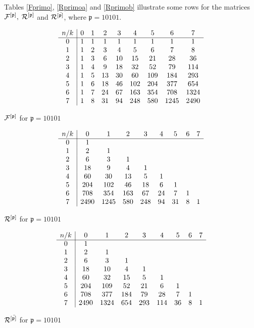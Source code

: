 \begin{example}
Tables \ref{Fprimo}, \ref{Rprimoa} and \ref{Rprimob}
illustrate some rows for the matrices ${\cal{F}^{[\mathfrak{p}]}},$
${\cal{R}^{[\mathfrak{p}]}}$ and ${\cal{R}^{[\bar{\mathfrak{p}]}}}$, where
$\mathfrak{p}=10101$.
\begin{table}
$$
\begin{array}{c|cccccccc}
n/k  & 0 & 1 & 2 & 3 & 4 &5 &6 &7  \\ \cline{1-9}
0 & 1 & 1 & 1 & 1& 1 &  1 & 1 & 1\\
1 & 1 & 2 & 3 & 4 & 5 & 6 & 7 & 8 \\
2 & 1 & 3 & 6 & 10 & 15 & 21 & 28 & 36\\
3 & 1 & 4 & 9 & 18 & 32 & 52& 79 & 114\\
4 & 1& 5 & 13 & 30 & 60 & 109& 184 & 293\\
5 & 1 & 6 & 18 & 46 & 102 & 204 & 377 & 654\\
6 & 1 & 7 & 24 & 67 & 163 & 354& 708 & 1324\\
7 & 1 & 8 & 31 & 94 & 248 &580& 1245 &2490\\
\end{array}
$$
\caption{\label{Fprimo} ${\cal{F}^{[\mathfrak{p}]}}$ for $\mathfrak{p}=10101$}
\end{table}
\begin{table}
$$
\begin{array}{c|cccccccc}
n/k  & 0 & 1 & 2 & 3 & 4 &5 &6 &7  \\ \cline{1-9}
0 & 1 & & & & & & &\\
1 & 2 & 1 & & &  & & &\\
2 & 6& 3 & 1 & & & &  &\\
3 & 18 & 9 & 4 & 1 & & &  &\\
4 & 60 & 30 & 13 & 5 & 1& & & \\
5 & 204 & 102 & 46 & 18 & 6 &1 & &\\
6 & 708 & 354 & 163 & 67 & 24 & 7& 1 &\\
7 & 2490 & 1245 &  580 &248 & 94 & 31 &  8 &1\\
\end{array}
$$
\caption{\label{Rprimoa} ${\cal{R}^{[\mathfrak{p}]}}$ for $\mathfrak{p}=10101$}
\end{table}
\begin{table}
$$
\begin{array}{c|cccccccc}
n/k  & 0 & 1 & 2 & 3 & 4 &5 &6 &7  \\ \cline{1-9}
0 & 1 & & & & & & &\\
1 & 2 & 1 & & &  & & &\\
2 & 6& 3 & 1 & & & &  &\\
3 & 18 & 10 & 4 & 1 & & &  &\\
4 & 60 & 32 & 15 & 5 & 1& & & \\
5 & 204 & 109 & 52 & 21 & 6 &1 & &\\
6 & 708 & 377 & 184 & 79 & 28 & 7& 1 &\\
7 & 2490 & 1324 &  654 &293 & 114 & 36 &  8 &1\\
\end{array}
$$
\caption{\label{Rprimob} ${\cal{R}^{[\bar{\mathfrak{p}]}}}$ for $\mathfrak{p}=10101$}
\end{table}
\end{example}

